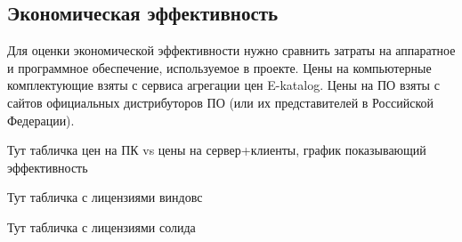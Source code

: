 \subsection{Экономическая эффективность}

Для оценки экономической эффективности нужно сравнить затраты на аппаратное и
программное обеспечение, используемое в проекте. Цены на компьютерные комплектующие 
взяты с сервиса агрегации цен E-katalog. Цены на ПО взяты с сайтов официальных
дистрибуторов ПО (или их представителей в Российской Федерации).

Тут табличка цен на ПК vs цены на сервер+клиенты, график показывающий эффективность

Тут табличка с лицензиями виндовс

Тут табличка с лицензиями солида

